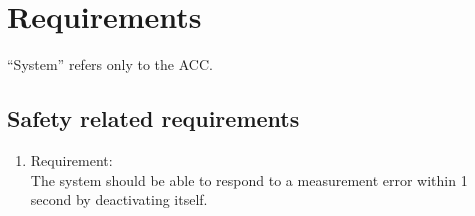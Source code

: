\section{Requirements}
\label{chapter6}

“System” refers only to the ACC.

\subsection{Safety related requirements}




 \begin{enumerate}[label*=\arabic*.]
 	\item \label{req.1}  Requirement: \\
	 	The system should be able to respond to a measurement error within 1 second by deactivating itself.  \\


\end{enumerate}
